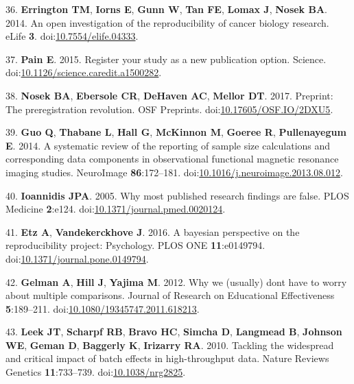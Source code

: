 \documentclass[]{article}
\begin{document}
\hypertarget{ref-Errington2014}{}
36. \textbf{Errington TM}, \textbf{Iorns E}, \textbf{Gunn W},
\textbf{Tan FE}, \textbf{Lomax J}, \textbf{Nosek BA}. 2014. An open
investigation of the reproducibility of cancer biology research. eLife
\textbf{3}.
doi:\href{https://doi.org/10.7554/elife.04333}{10.7554/elife.04333}.

\hypertarget{ref-Pain2015}{}
37. \textbf{Pain E}. 2015. Register your study as a new publication
option. Science.
doi:\href{https://doi.org/10.1126/science.caredit.a1500282}{10.1126/science.caredit.a1500282}.

\hypertarget{ref-Nosek2017}{}
38. \textbf{Nosek BA}, \textbf{Ebersole CR}, \textbf{DeHaven AC},
\textbf{Mellor DT}. 2017. Preprint: The preregistration revolution. OSF
Preprints.
doi:\href{https://doi.org/10.17605/OSF.IO/2DXU5}{10.17605/OSF.IO/2DXU5}.

\hypertarget{ref-Guo2014}{}
39. \textbf{Guo Q}, \textbf{Thabane L}, \textbf{Hall G},
\textbf{McKinnon M}, \textbf{Goeree R}, \textbf{Pullenayegum E}. 2014. A
systematic review of the reporting of sample size calculations and
corresponding data components in observational functional magnetic
resonance imaging studies. NeuroImage \textbf{86}:172--181.
doi:\href{https://doi.org/10.1016/j.neuroimage.2013.08.012}{10.1016/j.neuroimage.2013.08.012}.

\hypertarget{ref-Ioannidis2005}{}
40. \textbf{Ioannidis JPA}. 2005. Why most published research findings
are false. PLOS Medicine \textbf{2}:e124.
doi:\href{https://doi.org/10.1371/journal.pmed.0020124}{10.1371/journal.pmed.0020124}.

\hypertarget{ref-Etz2016}{}
41. \textbf{Etz A}, \textbf{Vandekerckhove J}. 2016. A bayesian
perspective on the reproducibility project: Psychology. PLOS ONE
\textbf{11}:e0149794.
doi:\href{https://doi.org/10.1371/journal.pone.0149794}{10.1371/journal.pone.0149794}.

\hypertarget{ref-Gelman2012}{}
42. \textbf{Gelman A}, \textbf{Hill J}, \textbf{Yajima M}. 2012. Why we
(usually) dont have to worry about multiple comparisons. Journal of
Research on Educational Effectiveness \textbf{5}:189--211.
doi:\href{https://doi.org/10.1080/19345747.2011.618213}{10.1080/19345747.2011.618213}.

\hypertarget{ref-Leek2010}{}
43. \textbf{Leek JT}, \textbf{Scharpf RB}, \textbf{Bravo HC},
\textbf{Simcha D}, \textbf{Langmead B}, \textbf{Johnson WE},
\textbf{Geman D}, \textbf{Baggerly K}, \textbf{Irizarry RA}. 2010.
Tackling the widespread and critical impact of batch effects in
high-throughput data. Nature Reviews Genetics \textbf{11}:733--739.
doi:\href{https://doi.org/10.1038/nrg2825}{10.1038/nrg2825}.
\end{document}
